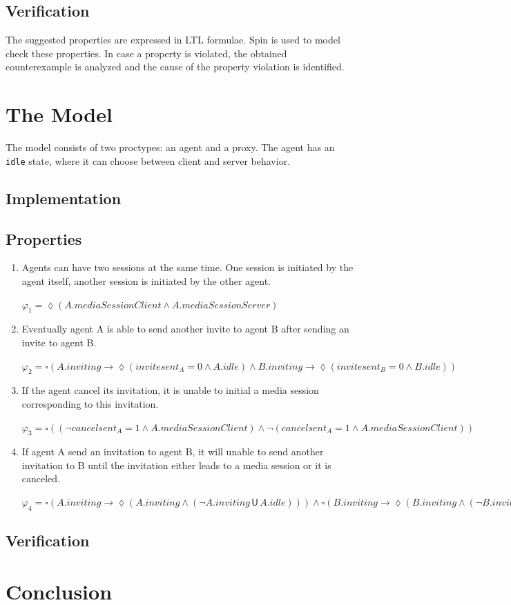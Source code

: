 \documentclass{article}
\newcommand{\eventually}{\lozenge} %
\newcommand{\always}{\square} %
\newcommand{\until}{\mathsf{\, U \,}} %
\begin{document}
\subsection{Verification}

The suggested properties are expressed in LTL formulae. Spin is used to model check these properties.
In case a property is violated, the obtained counterexample is analyzed and the cause of the property violation
is identified. 


\section{The Model}

The model consists of two proctypes: an agent and a proxy. The agent has an \texttt{idle} state, where
it can choose between client and server behavior.


\subsection{Implementation}

\subsection{Properties}

\begin{enumerate}
	\item Agents can have two sessions at the same time. One session is initiated by the agent itself, another session is initiated by the other agent.
	
	$ \varphi_1 = \eventually (A.mediaSessionClient \wedge A.mediaSessionServer) $
		
	\item Eventually agent A is able to send another invite to agent B after sending an invite to agent B.
	
	$ \varphi_2 = \always (A.inviting \to \eventually (invitesent_A = 0 \wedge A.idle) \wedge B.inviting
	\to \eventually (invitesent_B = 0 \wedge B.idle))$
	
	\item If the agent cancel its invitation, it is unable to initial a media session corresponding to this invitation.

	$\varphi_3 = \always((\neg cancelsent_A = 1 \wedge A.mediaSessionClient) \wedge \neg(cancelsent_A = 1 \wedge A.mediaSessionClient) )$
	
	
	\item If agent A send an invitation to agent B, it will unable to send another invitation to B until the
	invitation either leads to a media session or it is canceled.
	
	$\varphi_4 = \always(A.inviting \to \eventually(A.inviting \wedge (\neg A.inviting \until A.idle))) \wedge \always(B.inviting \to \eventually(B.inviting \wedge (\neg B.inviting \until B.idle)))$
	
\end{enumerate}


\subsection{Verification}



\section{Conclusion}
\end{document}
